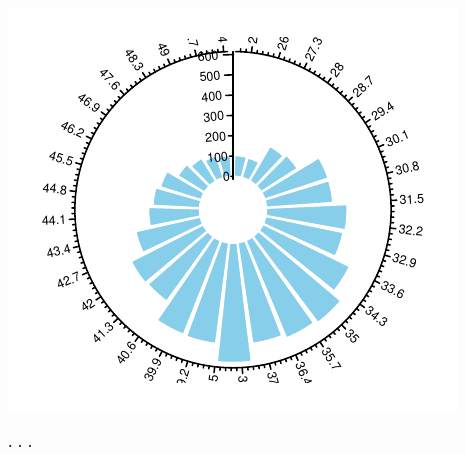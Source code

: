 \documentclass{article}\usepackage[]{graphicx}\usepackage[]{color}
\makeatletter
\def\maxwidth{ %
  \ifdim\Gin@nat@width>\linewidth
    \linewidth
  \else
    \Gin@nat@width
  \fi
}
\newenvironment{knitrout}{}{} %
\makeatother
\begin{document}
\begin{knitrout}
\color{fgcolor}

{\centering \includegraphics[width=\maxwidth]{figure/circlize_colum-1} 

}



\end{knitrout}
\begin{center}
\textbf{. . .}
\end{center}
\end{document}
